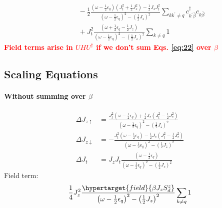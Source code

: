 \documentclass[14pt]{extarticle}
\newcommand{\qs}[1]{\textbf{{\textcolor{red}{#1}}}}
\numberwithin{equation}{section}
\begin{document}
\begin{subequations}
\begin{align}
&\hspace{30pt} - \frac{1}{2} \frac{\left( \omega -\frac{1}{2}\epsilon_q  \right) \left( J_t^2 + \frac{1}{2} J_z^2 \right) - \frac{1}{2} J_zJ_t^2}{\left( \omega -\frac{1}{2}\epsilon_q  \right)^2 - \left( \frac{1}{2}J_z \right)^2} \sum\limits_{kk^{\prime}\ne q} c^{\dag}_{k^{\prime}\bar{\beta}} c_{k\bar{\beta}}  \nonumber\\
                                                                                         &\hspace{30pt} + J_t^2 \frac{\left( \omega + \frac{1}{2}\epsilon_q - \frac{1}{2} J_z \right)}{\left( \omega -\frac{1}{2}\epsilon_q  \right)^2 - \left( \frac{1}{2}J_z \right)^2} \sum\limits_{k\ne q} 1 \label{eq:19} 
\end{align}
\end{subequations}
\hypertarget{q2}{\qs{Field terms arise in $U HU^{\dag}$ if we don't sum Eqs. \eqref{eq:22} over $\beta$}}

\subsection{Scaling Equations}
\paragraph{Without summing over \(\beta\)}
\begin{equation}\begin{aligned}
	\Delta J_{z \uparrow} &= \frac{J_t^2 \left( \omega - \frac{1}{2}\epsilon_q \right)+ \frac{1}{2} J_z \left( J_t^2 - \frac{1}{2}J_z^2 \right)}{\left( \omega -\frac{1}{2}\epsilon_q  \right)^2 - \left( \frac{1}{2}J_z \right)^2}\\
	\Delta J_{z \downarrow} &= -\frac{J_t^2 \left( \omega - \frac{1}{2}\epsilon_q \right) - \frac{1}{2} J_z \left( J_t^2 - \frac{1}{2}J_z^2 \right)}{\left( \omega -\frac{1}{2}\epsilon_q  \right)^2 - \left( \frac{1}{2}J_z \right)^2}\\
	\Delta J_t &= J_zJ_t \frac{\left( \omega -\frac{1}{2}\epsilon_q  \right)}{\left( \omega -\frac{1}{2}\epsilon_q  \right)^2 - \left( \frac{1}{2}J_z \right)^2}
\end{aligned}\end{equation}
{\color{red}Field term:}
\begin{equation}\begin{aligned}
\frac{1}{4} J_z^2 \frac{\hypertarget{field}{\beta J_z S_d^z}}{\left( \omega -\frac{1}{2}\epsilon_q  \right)^2 - \left( \frac{1}{2}J_z \right)^2} \sum\limits_{k\ne q} 1
\end{aligned}\end{equation}
\end{document}
